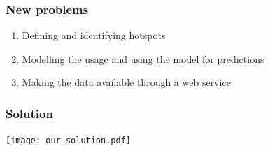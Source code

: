 \begin{frame}
\frametitle{New problems}
\begin{enumerate}
\item Defining and identifying hotspots
\item Modelling the usage and using the model for predictions
\item Making the data available through a web service
\end{enumerate}
\end{frame}

\begin{frame}
\frametitle{Solution}

\centering
\texttt{[image: our\_solution.pdf]}

\end{frame}